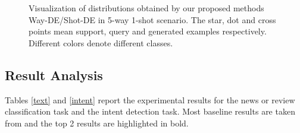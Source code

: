 \documentclass[letterpaper]{article} %
\begin{document}
\begin{figure}[t]
	\centering
	\caption{Visualization of distributions obtained by our proposed methods Way-DE/Shot-DE in 5-way 1-shot scenario. The star, dot and cross points mean support, query and generated examples respectively. Different colors denote different classes.}
	\label{visual}
\end{figure}

\subsection{Result Analysis}
Tables \ref{text} and \ref{intent} report the experimental results for the news or review classification task and the intent detection task. Most baseline results are taken from \cite{ContrastNet} and the top 2 results are highlighted in bold. 
\end{document}
